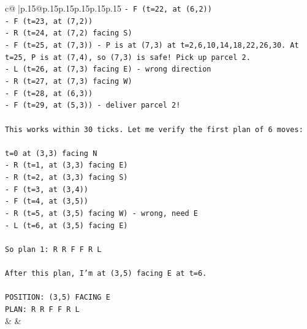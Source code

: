 \documentclass{article}
\begin{document}
{\begin{supertabular}{c@{$\;$}|p{.15\linewidth}@{}p{.15\linewidth}p{.15\linewidth}p{.15\linewidth}p{.15\linewidth}p{.15\linewidth}}
{{{\texttt{{-} F (t=22, at (6,2))} \\
\texttt{{-} F (t=23, at (7,2))} \\
\texttt{{-} R (t=24, at (7,2) facing S)} \\
\texttt{{-} F (t=25, at (7,3)) {-} P is at (7,3) at t=2,6,10,14,18,22,26,30. At t=25, P is at (7,4), so (7,3) is safe! Pick up parcel 2.} \\
\texttt{{-} L (t=26, at (7,3) facing E) {-} wrong direction} \\
\texttt{{-} R (t=27, at (7,3) facing W)} \\
\texttt{{-} F (t=28, at (6,3))} \\
\texttt{{-} F (t=29, at (5,3)) {-} deliver parcel 2!} \\
\\ 
\texttt{This works within 30 ticks. Let me verify the first plan of 6 moves:} \\
\\ 
\texttt{t=0 at (3,3) facing N} \\
\texttt{{-} R (t=1, at (3,3) facing E)} \\
\texttt{{-} R (t=2, at (3,3) facing S)} \\
\texttt{{-} F (t=3, at (3,4))} \\
\texttt{{-} F (t=4, at (3,5))} \\
\texttt{{-} R (t=5, at (3,5) facing W) {-} wrong, need E} \\
\texttt{{-} L (t=6, at (3,5) facing E)} \\
\\ 
\texttt{So plan 1: R R F F R L} \\
\\ 
\texttt{After this plan, I'm at (3,5) facing E at t=6.} \\
\\ 
\texttt{POSITION: (3,5) FACING E} \\
\texttt{PLAN: R R F F R L} \\
            }
        }
    }
    & & \\ \\


\end{supertabular}}
\end{document}
